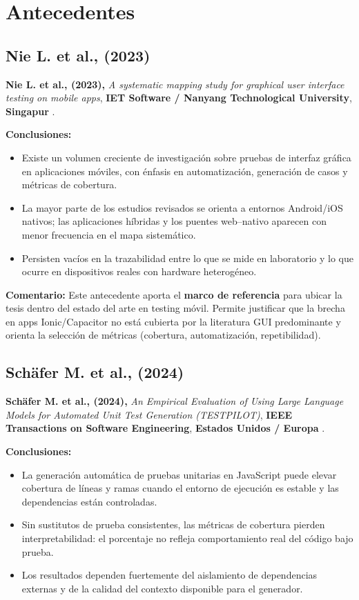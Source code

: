 \section{Antecedentes}
\label{chap:antecedentes}

\subsection{Nie L. et al., (2023)}
\label{sec:antecedente_nie}

\textbf{Nie L. et al., (2023),} \textit{A systematic mapping study for graphical user interface testing on mobile apps}, \textbf{IET Software / Nanyang Technological University}, \textbf{Singapur} \cite{nie2023gui_mobile_mapping}.

\textbf{Conclusiones:}
\begin{itemize}
    \item Existe un volumen creciente de investigación sobre pruebas de interfaz gráfica en aplicaciones móviles, con énfasis en automatización, generación de casos y métricas de cobertura.
    \item La mayor parte de los estudios revisados se orienta a entornos Android/iOS nativos; las aplicaciones híbridas y los puentes web--nativo aparecen con menor frecuencia en el mapa sistemático.
    \item Persisten vacíos en la trazabilidad entre lo que se mide en laboratorio y lo que ocurre en dispositivos reales con hardware heterogéneo.
\end{itemize}

\textbf{Comentario:} Este antecedente aporta el \textbf{marco de referencia} para ubicar la tesis dentro del estado del arte en testing móvil. Permite justificar que la brecha en apps Ionic/Capacitor no está cubierta por la literatura GUI predominante y orienta la selección de métricas (cobertura, automatización, repetibilidad).

\subsection{Schäfer M. et al., (2024)}
\label{sec:antecedente_schafer}

\textbf{Schäfer M. et al., (2024),} \textit{An Empirical Evaluation of Using Large Language Models for Automated Unit Test Generation (TESTPILOT)}, \textbf{IEEE Transactions on Software Engineering}, \textbf{Estados Unidos / Europa} \cite{schafer2024testpilot}.

\textbf{Conclusiones:}
\begin{itemize}
    \item La generación automática de pruebas unitarias en JavaScript puede elevar cobertura de líneas y ramas cuando el entorno de ejecución es estable y las dependencias están controladas.
    \item Sin sustitutos de prueba consistentes, las métricas de cobertura pierden interpretabilidad: el porcentaje no refleja comportamiento real del código bajo prueba.
    \item Los resultados dependen fuertemente del aislamiento de dependencias externas y de la calidad del contexto disponible para el generador.
\end{itemize}

